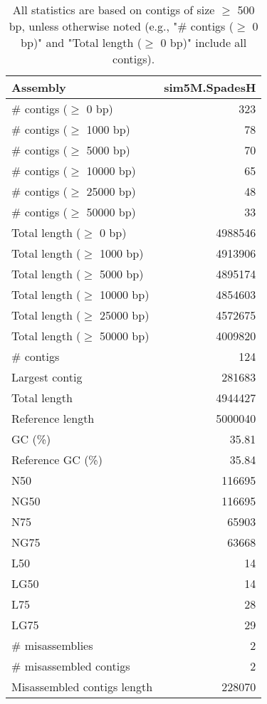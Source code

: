 \documentclass[12pt,a4paper]{article}
\begin{document}
\begin{table}[ht]
\begin{center}
\caption{All statistics are based on contigs of size $\geq$ 500 bp, unless otherwise noted (e.g., "\# contigs ($\geq$ 0 bp)" and "Total length ($\geq$ 0 bp)" include all contigs).}
\begin{tabular}{|l*{1}{|r}|}
\hline
Assembly & sim5M.SpadesH \\ \hline
\# contigs ($\geq$ 0 bp) & 323 \\ \hline
\# contigs ($\geq$ 1000 bp) & 78 \\ \hline
\# contigs ($\geq$ 5000 bp) & 70 \\ \hline
\# contigs ($\geq$ 10000 bp) & 65 \\ \hline
\# contigs ($\geq$ 25000 bp) & 48 \\ \hline
\# contigs ($\geq$ 50000 bp) & 33 \\ \hline
Total length ($\geq$ 0 bp) & 4988546 \\ \hline
Total length ($\geq$ 1000 bp) & 4913906 \\ \hline
Total length ($\geq$ 5000 bp) & 4895174 \\ \hline
Total length ($\geq$ 10000 bp) & 4854603 \\ \hline
Total length ($\geq$ 25000 bp) & 4572675 \\ \hline
Total length ($\geq$ 50000 bp) & 4009820 \\ \hline
\# contigs & 124 \\ \hline
Largest contig & 281683 \\ \hline
Total length & 4944427 \\ \hline
Reference length & 5000040 \\ \hline
GC (\%) & 35.81 \\ \hline
Reference GC (\%) & 35.84 \\ \hline
N50 & 116695 \\ \hline
NG50 & 116695 \\ \hline
N75 & 65903 \\ \hline
NG75 & 63668 \\ \hline
L50 & 14 \\ \hline
LG50 & 14 \\ \hline
L75 & 28 \\ \hline
LG75 & 29 \\ \hline
\# misassemblies & 2 \\ \hline
\# misassembled contigs & 2 \\ \hline
Misassembled contigs length & 228070 \\ \hline

\end{tabular}
\end{center}
\end{table}
\end{document}
